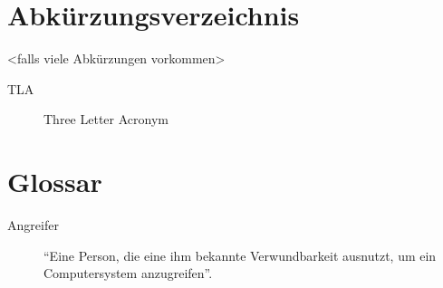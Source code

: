 \documentclass[12pt,a4paper, halfparskip]{scrartcl}
\begin{document}
\newpage
\pagestyle{empty}
\section*{Abkürzungsverzeichnis}
<falls viele Abkürzungen vorkommen>
\begin{description}
	\item [TLA] Three Letter Acronym
\end{description}

\newpage
\pagestyle{empty}
\section*{Glossar}
\begin{description}
	\item[Angreifer] "`Eine Person, die eine ihm bekannte Verwundbarkeit ausnutzt, um ein Computersystem anzugreifen"'. 
\end{description}

\end{document}
